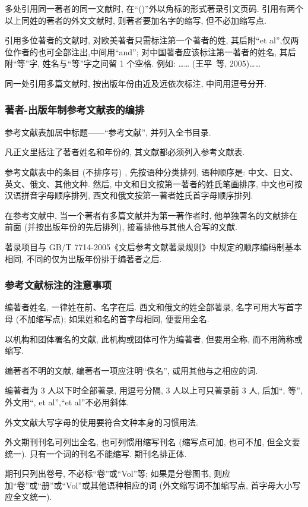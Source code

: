 多处引用同一著者的同一文献时, 在“()”外以角标的形式著录引文页码. 引用有两个以上同姓的著者的外文文献时, 则著者要加名字的缩写, 但不必加缩写点.

引用多位著者的文献时, 对欧美著者只需标注第一个著者的姓, 其后附“et al”,仅两位作者的也可全部注出,中间用“and”; 对中国著者应该标注第一著者的姓名, 其后附“等”字, 姓名与“等”字之间留 1 个空格. 例如: …… (王平\ 等, 2005)……

同一处引用多篇文献时, 按出版年份由近及远依次标注, 中间用逗号分开.

\subsubsection{著者-出版年制参考文献表的编排}

参考文献表加居中标题——“参考文献”, 并列入全书目录.

凡正文里括注了著者姓名和年份的, 其文献都必须列入参考文献表.

参考文献表中的条目 (不排序号) , 先按语种分类排列, 语种顺序是: 中文、日文、英文、俄文、其他文种. 然后, 中文和日文按第一著者的姓氏笔画排序, 中文也可按汉语拼音字母顺序排列, 西文和俄文按第一著者姓氏首字母顺序排列.

在参考文献中, 当一个著者有多篇文献并为第一著作者时, 他单独署名的文献排在前面 (并按出版年份的先后排列), 接着排他与其他人合写的文献.

著录项目与 GB/T 7714-2005《文后参考文献著录规则》中规定的顺序编码制基本相同, 不同的仅为出版年份排于编著者之后.

\subsubsection{参考文献标注的注意事项}

编著者姓名, 一律姓在前、名字在后. 西文和俄文的姓全部著录, 名字可用大写首字母 (不加缩写点); 如果姓和名的首字母相同, 便要用全名.

以机构和团体署名的文献, 此机构或团体可作为编著者, 但要用全称, 而不用简称或缩写.

编著者不明的文献, 编著者一项应注明“佚名”, 或用其他与之相应的词.

编著者为 3 人以下时全部著录, 用逗号分隔, 3 人以上可只著录前 3 人, 后加“, 等”, 外文用“, et al”,“et al”不必用斜体.

外文文献大写字母的使用要符合文种本身的习惯用法.

外文期刊刊名可列出全名, 也可列惯用缩写刊名 (缩写点可加, 也可不加, 但全文要统一). 只有一个词的刊名不能缩写. 期刊名排正体.

期刊只列出卷号, 不必标“卷”或“Vol”等; 如果是分卷图书, 则应加“卷”或“册”或“Vol”或其他语种相应的词 (外文缩写词不加缩写点, 首字母大小写应全文统一).

